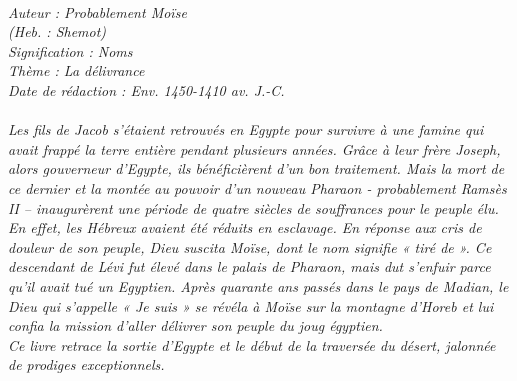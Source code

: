 \BFont
\noindent\hrulefill
{\footnotesize
\textit{
\bigskip
{\centering{}
\\Auteur : Probablement Moïse
\\(Heb. : Shemot)
\\Signification : Noms
\\Thème : La délivrance
\\Date de rédaction : Env. 1450-1410 av. J.-C.\\}
}
\textit{
\\Les fils de Jacob s’étaient retrouvés en Egypte pour survivre à une famine qui avait frappé la terre entière pendant plusieurs années. Grâce à leur frère Joseph, alors gouverneur d’Egypte, ils bénéficièrent d’un bon traitement. Mais la mort de ce dernier et la montée au pouvoir d’un nouveau Pharaon - probablement Ramsès II – inaugurèrent une période de quatre siècles de souffrances pour le peuple élu.
\\En effet, les Hébreux avaient été réduits en esclavage. En réponse aux cris de douleur de son peuple, Dieu suscita Moïse, dont le nom signifie « tiré de ». Ce descendant de Lévi fut élevé dans le palais de Pharaon, mais dut s’enfuir parce qu’il avait tué un Egyptien. Après quarante ans passés dans le pays de Madian, le Dieu qui s’appelle « Je suis » se révéla à Moïse sur la montagne d’Horeb et lui confia la mission d’aller délivrer son peuple du joug égyptien.
\\Ce livre retrace la sortie d’Egypte et le début de la traversée du désert, jalonnée de prodiges exceptionnels.\bigskip
}
}
\par\nobreak\noindent\hrulefill
